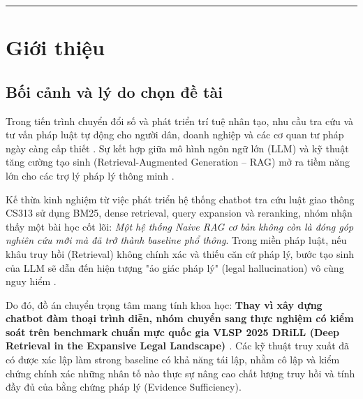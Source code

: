 \documentclass[12pt,a4paper]{article}
\begin{document}
\vspace{0.05cm}

\vspace{0.1cm}
\hrule

\section{Giới thiệu}

\subsection{Bối cảnh và lý do chọn đề tài}
Trong tiến trình chuyển đổi số và phát triển trí tuệ nhân tạo, nhu cầu tra cứu và tư vấn pháp luật tự động cho người dân, doanh nghiệp và các cơ quan tư pháp ngày càng cấp thiết \cite{xiao2021lawformer, chalkidis2020legal}. Sự kết hợp giữa mô hình ngôn ngữ lớn (LLM) và kỹ thuật tăng cường tạo sinh (Retrieval-Augmented Generation -- RAG) mở ra tiềm năng lớn cho các trợ lý pháp lý thông minh \cite{lewis2020retrieval, cs313rag2024}.

Kế thừa kinh nghiệm từ việc phát triển hệ thống chatbot tra cứu luật giao thông CS313 \cite{cs313rag2024} sử dụng BM25, dense retrieval, query expansion và reranking, nhóm nhận thấy một bài học cốt lõi: \textit{Một hệ thống Naive RAG cơ bản không còn là đóng góp nghiên cứu mới mà đã trở thành baseline phổ thông}. Trong miền pháp luật, nếu khâu truy hồi (Retrieval) không chính xác và thiếu căn cứ pháp lý, bước tạo sinh của LLM sẽ dẫn đến hiện tượng "ảo giác pháp lý" (legal hallucination) vô cùng nguy hiểm \cite{khattab2020colbert}.

Do đó, đồ án chuyển trọng tâm mang tính khoa học: \textbf{Thay vì xây dựng chatbot đàm thoại trình diễn, nhóm chuyển sang thực nghiệm có kiểm soát trên benchmark chuẩn mực quốc gia VLSP 2025 DRiLL (Deep Retrieval in the Expansive Legal Landscape) \cite{vlsp2025drill}}. Các kỹ thuật truy xuất đã có được xác lập làm strong baseline có khả năng tái lập, nhằm cô lập và kiểm chứng chính xác những nhân tố nào thực sự nâng cao chất lượng truy hồi và tính đầy đủ của bằng chứng pháp lý (Evidence Sufficiency).
\end{document}
